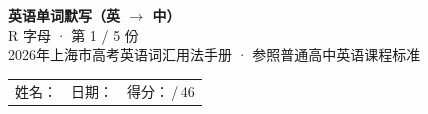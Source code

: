 \documentclass[10pt,a4paper]{article}
\begin{document}
\pagestyle{plain}

\begin{center}
{\LARGE\bfseries 英语单词默写（英 $\to$ 中）}\\[0.22em]
{\large R 字母 · 第 1 / 5 份}\\[0.18em]
{\small 2026年上海市高考英语词汇用法手册 · 参照普通高中英语课程标准}
\end{center}

\vspace{0.25em}
\noindent\begin{tabular}{@{}p{}@{}p{}@{}p{}@{}}
姓名：\underline{\hspace{2.0cm}} & 日期：\underline{\hspace{2.0cm}} & 得分：\underline{\hspace{1.3cm}}\,/\,46 \\
\end{tabular}

\vspace{0.3em}

\vspace{0.08em}
\end{document}
